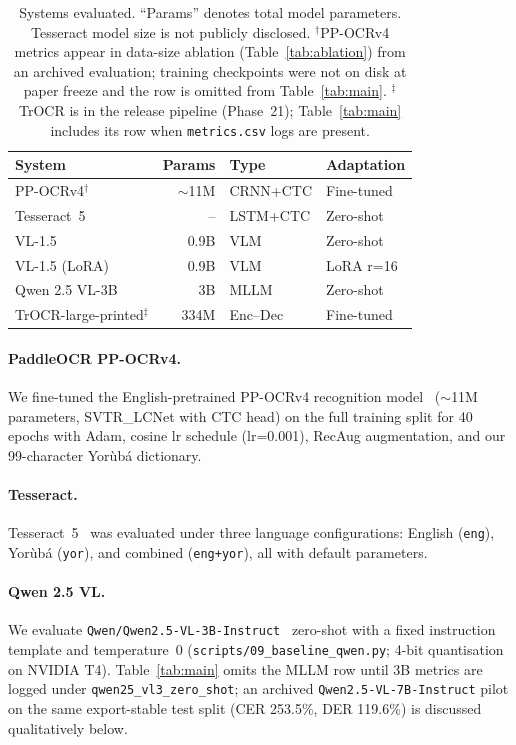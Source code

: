 \documentclass{article}
\newcommand{\Yoruba}{Yor\`ub\'a}
\begin{document}
\begin{table}[t]
  \centering
  \small
  \begin{tabular}{lrll}
    \toprule
    System & Params & Type & Adaptation \\
    \midrule
    PP-OCRv4$^\dagger$ & ${\sim}$11M & CRNN+CTC & Fine-tuned \\
    Tesseract~5 & -- & LSTM+CTC & Zero-shot \\
    VL-1.5 & 0.9B & VLM & Zero-shot \\
    VL-1.5 (LoRA) & 0.9B & VLM & LoRA r=16 \\
    Qwen 2.5 VL-3B & 3B & MLLM & Zero-shot \\
    TrOCR-large-printed$^\ddagger$ & 334M & Enc--Dec & Fine-tuned \\
    \bottomrule
  \end{tabular}
  \caption{Systems evaluated. ``Params'' denotes total model parameters. Tesseract model size is not publicly disclosed. $^\dagger$PP-OCRv4 metrics appear in data-size ablation (Table~\ref{tab:ablation}) from an archived evaluation; training checkpoints were not on disk at paper freeze and the row is omitted from Table~\ref{tab:main}. $^\ddagger$TrOCR is in the release pipeline (Phase~21); Table~\ref{tab:main} includes its row when \texttt{metrics.csv} logs are present.}
  \label{tab:models}
\end{table}

\paragraph{PaddleOCR PP-OCRv4.}
We fine-tuned the English-pretrained PP-OCRv4 recognition model~\cite{du2020ppocr} (${\sim}$11M parameters, SVTR\_LCNet with CTC head) on the full training split for 40 epochs with Adam, cosine lr schedule (lr=0.001), RecAug augmentation, and our 99-character \Yoruba{} dictionary.

\paragraph{Tesseract.}
Tesseract~5~\cite{smith2007tesseract} was evaluated under three language configurations: English (\texttt{eng}), \Yoruba{} (\texttt{yor}), and combined (\texttt{eng+yor}), all with default parameters.

\paragraph{Qwen 2.5 VL.}
\label{sec:models-qwen}
We evaluate \texttt{Qwen/Qwen2.5-VL-3B-Instruct}~\cite{qwen2025vl,bai2024qwen2vl}
zero-shot with a fixed instruction template and temperature~0
(\texttt{scripts/09\_baseline\_qwen.py}; 4-bit quantisation on NVIDIA T4).
Table~\ref{tab:main} omits the MLLM row until 3B metrics are logged under
\texttt{qwen25\_vl3\_zero\_shot}; an archived \texttt{Qwen2.5-VL-7B-Instruct}
pilot on the same export-stable test split (CER 253.5\%, DER 119.6\%) is
discussed qualitatively below.
\end{document}
